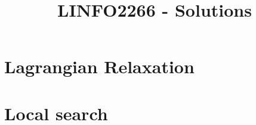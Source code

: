 \documentclass{article}
\title{LINFO2266 - Solutions}
\begin{document}
\maketitle

\section{Lagrangian Relaxation}


\section{Local search}

\end{document}
